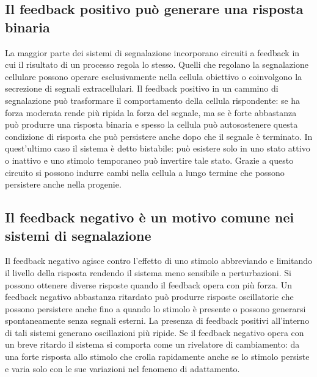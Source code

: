 \subsection{Il feedback positivo pu\`o generare una risposta binaria}
La maggior parte dei sistemi di segnalazione incorporano circuiti a feedback in cui il risultato di un processo regola lo stesso. Quelli che regolano la segnalazione cellulare possono
operare esclusivamente nella cellula obiettivo o coinvolgono la secrezione di segnali extracellulari. Il feedback positivo in un cammino di segnalazione pu\`o trasformare il 
comportamento della cellula rispondente: se ha forza moderata rende pi\`u ripida la forza del segnale, ma se \`e forte abbastanza pu\`o produrre una risposta binaria e spesso la
cellula pu\`o autosostenere questa condizione di risposta che pu\`o persistere anche dopo che il segnale \`e terminato. In quest'ultimo caso il sistema \`e detto bistabile: pu\`o 
esistere solo in uno stato attivo o inattivo e uno stimolo temporaneo pu\`o invertire tale stato. Grazie a questo circuito si possono indurre cambi nella cellula a lungo termine che
possono persistere anche nella progenie. 
\subsection{Il feedback negativo \`e un motivo comune nei sistemi di segnalazione}
Il feedback negativo agisce contro l'effetto di uno stimolo abbreviando e limitando il livello della risposta rendendo il sistema meno sensibile a perturbazioni. Si possono ottenere
diverse risposte quando il feedback opera con pi\`u forza. Un feedback negativo abbastanza ritardato pu\`o produrre risposte oscillatorie che possono persistere anche fino a quando lo
stimolo \`e presente o possono generarsi spontaneamente senza segnali esterni. La presenza di feedback positivi all'interno di tali sistemi generano oscillazioni pi\`u ripide. Se il 
feedback negativo opera con un breve ritardo il sistema si comporta come un rivelatore di cambiamento: da una forte risposta allo stimolo che crolla rapidamente anche se lo stimolo
persiste e varia solo con le sue variazioni nel fenomeno di adattamento.
